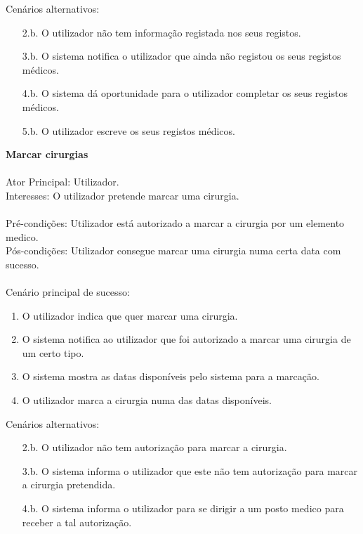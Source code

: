\documentclass[12pt, a4paper, twoside]{report} %
\begin{document}
\noindent Cenários alternativos:
	\begin{enumerate}
	\item [2.b.] O utilizador não tem informação registada nos seus registos.
	\item [3.b.] O sistema notifica o utilizador que ainda não registou os seus registos médicos.
	\item [4.b.] O sistema dá oportunidade para o utilizador completar os seus registos médicos.
	\item [5.b.] O utilizador escreve os seus registos médicos.
	\end{enumerate}

\noindent\textbf{Marcar cirurgias}
\\
\\
Ator Principal: Utilizador.\\
Interesses: O utilizador pretende marcar uma cirurgia.\\
\\
Pré-condições: Utilizador está autorizado a marcar a cirurgia por um elemento medico.\\
Pós-condições: Utilizador consegue marcar uma cirurgia numa certa data com sucesso.\\
\\
Cenário principal de sucesso:
	\begin{enumerate}
	\item O utilizador indica que quer marcar uma cirurgia.
	\item O sistema notifica ao utilizador que foi autorizado a marcar uma cirurgia de um certo tipo.
	\item O sistema mostra as datas disponíveis pelo sistema para a marcação.
	\item O utilizador marca a cirurgia numa das datas disponíveis.
	\end{enumerate}

\noindent Cenários alternativos:
	\begin{enumerate}
	\item [2.b.] O utilizador não tem autorização para marcar a cirurgia.
	\item [3.b.] O sistema informa o utilizador que este não tem autorização para marcar a cirurgia pretendida.
	\item [4.b.] O sistema informa o utilizador para se dirigir a um posto medico para receber a tal autorização.
	\end{enumerate}
\end{document}
